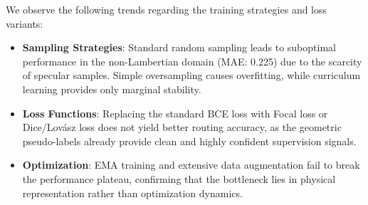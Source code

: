 \documentclass[lettersize,journal]{IEEEtran}
\begin{document}
\begin{table}[!t]
\centering
\caption{Ablation Study on Training Strategies and Loss Functions. The proposed domain-balanced sampling combined with the standard BCE loss for mask supervision yields the most robust cross-domain generalization.}
\label{tab:training_ablation}
\end{table}

We observe the following trends regarding the training strategies and loss variants:
\begin{itemize}
    \item \textbf{Sampling Strategies}: Standard random sampling leads to suboptimal performance in the non-Lambertian domain (MAE: 0.225) due to the scarcity of specular samples. Simple oversampling causes overfitting, while curriculum learning provides only marginal stability.
    \item \textbf{Loss Functions}: Replacing the standard BCE loss with Focal loss or Dice/Lov\'{a}sz loss does not yield better routing accuracy, as the geometric pseudo-labels already provide clean and highly confident supervision signals.
    \item \textbf{Optimization}: EMA training and extensive data augmentation fail to break the performance plateau, confirming that the bottleneck lies in physical representation rather than optimization dynamics.
\end{itemize}
\end{document}
